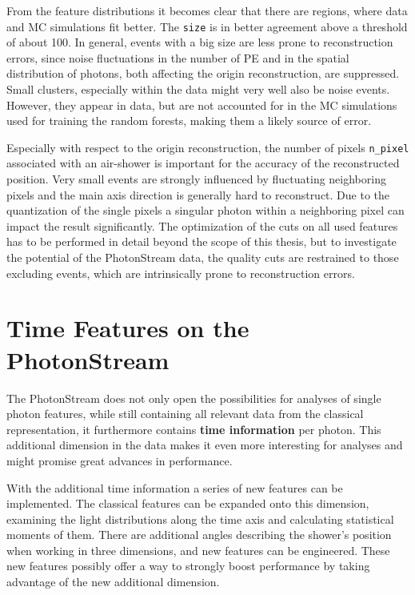 %
From the feature distributions it becomes clear that there are regions, where
data and MC simulations fit better. The \texttt{size} is in better agreement
above a threshold of about \num{100}. In general, events with a big size are
less prone to reconstruction errors, since  noise fluctuations in the number of
PE and in the spatial distribution of photons, both affecting the origin
reconstruction, are suppressed. Small clusters, especially within the data
might very well also be noise events. However, they appear in data, but are not
accounted for in the MC simulations used for training the random forests, making them a likely source of error.

Especially with respect to the origin reconstruction, the number of pixels
\texttt{n\_pixel} associated with an air-shower is important for the accuracy
of the reconstructed position. Very small events are strongly influenced by
fluctuating neighboring pixels and the main axis direction is generally hard to
reconstruct. Due to the quantization of the single pixels a singular photon
within a neighboring pixel can impact the result significantly.
The optimization of the cuts on all used features has to be performed in
detail beyond the scope of this thesis, but to investigate the potential of the
PhotonStream data, the quality cuts are restrained to those excluding events,
which are intrinsically prone to reconstruction errors.

\section{Time Features on the PhotonStream}
%
The PhotonStream does not only open the possibilities for analyses of single
photon features, while still containing all relevant data from the classical
representation, it furthermore contains \textbf{time information} per photon.
This additional dimension in the data makes it even more interesting for
analyses and might promise great advances in performance.

With the additional time information a series of new features can be
implemented. The classical features can be expanded onto this dimension,
examining the light distributions along the time axis and calculating
statistical moments of them. There are additional angles describing the
shower's position when working in three dimensions, and new features can be
engineered. These new features possibly offer a way to strongly boost
performance by taking advantage of the new additional dimension.

